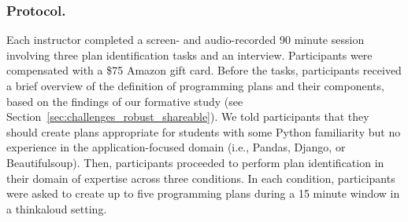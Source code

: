 


 

\subsubsection{Protocol.}
Each instructor completed a screen- and audio-recorded 90 minute session involving three plan identification tasks and an interview. Participants were compensated with a \$75 Amazon gift card. %
Before the tasks, participants received a brief overview of the definition of programming plans and their components, based on the findings of our formative study (see Section~\ref{sec:challenges_robust_shareable}). %
We told participants that they should create plans appropriate for students with some Python familiarity but no experience in the application-focused domain (i.e., Pandas, Django, or Beautifulsoup).
Then, participants proceeded to perform plan identification in their domain of expertise across three conditions.
In each condition, participants were asked to create up to five programming plans during a 15 minute window in a thinkaloud setting. 


